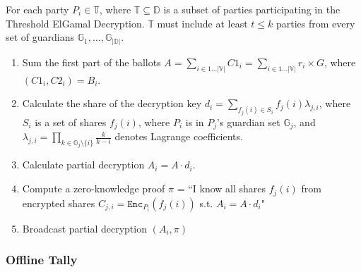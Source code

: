 \documentclass{article}
\begin{document}
For each party $P_i \in \mathbb{T}$, where $\mathbb{T} \subseteq  \mathbb{D}$ is a subset of parties participating in the Threshold ElGamal Decryption. $\mathbb{T}$ must include at least $t \leq k$ parties from every set of guardians $\mathbb{G}_1,\dots,\mathbb{G}_{|\mathbb{D}|}$.
\begin{enumerate}
    \item Sum the first part of the ballots $A = \sum_{i \in 1 \dots |\mathbb{V}|} C1_i = \sum_{i \in 1 \dots |\mathbb{V}|} r_{i} \times G$, where $(C1_i,C2_i)=B_i$.
    \item  Calculate the share of the decryption key $d_i=\sum_{f_j(i) \in S_i} f_j(i) \lambda_{j,i}$, where $S_i$ is a set of shares $f_j(i)$, where $P_i$ is in $P_j$'s guardian set $\mathbb{G}_j$, and $\lambda_{j,i}=\prod_{k \in \mathbb{G}_j \setminus \{i\}} \frac{k}{k-i}$ denotes Lagrange coefficients. 
    \item Calculate partial decryption $A_i = A \cdot d_i$.
    \item Compute a zero-knowledge proof $\pi$ = “I know all shares $f_j(i)$ from encrypted shares $C_{j,i}=\texttt{Enc}_{P_i}(f_j(i))$ s.t. $A_i = A \cdot d_i$"
    \item Broadcast partial decryption $(A_i, \pi)$
\end{enumerate}

\subsubsection{Offline Tally}
\end{document}
